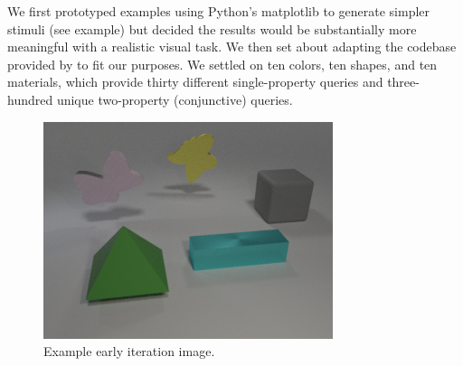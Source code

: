 We first prototyped examples using Python’s matplotlib \parencite{Hunter2007} to generate simpler stimuli (see example) but decided the results would be substantially more meaningful with a realistic visual task. We then set about adapting the codebase provided by \textcite{Johnson2017} to fit our purposes. We settled on ten colors, ten shapes, and ten materials, which provide thirty different single-property queries and three-hundred unique two-property (conjunctive) queries. 

\begin{figure}
\vspace{-.4in}
\begin{spacing}{1.0}
\centering
\includegraphics[width=.95\linewidth]{ch-dataset-task-benchmark/figures/dataset/first_iteration_image.png}
\caption{Example early iteration image.}
\label{fig:dataset-early-image}
\end{spacing}
\end{figure}

